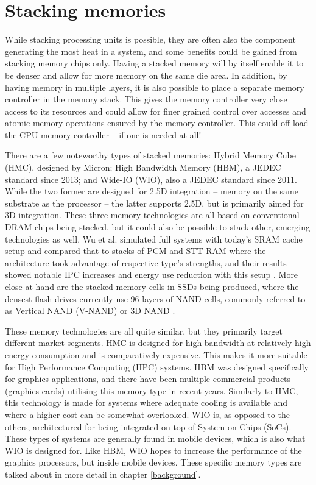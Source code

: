 \section{Stacking memories}
While stacking processing units is possible, they are often also the component generating the most heat in a system, and some benefits could be gained from stacking memory chips only. Having a stacked memory will by itself enable it to be denser and allow for more memory on the same die area. In addition, by having memory in multiple layers, it is also possible to place a separate memory controller in the memory stack. This gives the memory controller very close access to its resources and could allow for finer grained control over accesses and atomic memory operations ensured by the memory controller. This could off-load the CPU memory controller -- if one is needed at all!
\bigskip

There are a few noteworthy types of stacked memories: Hybrid Memory Cube (HMC), designed by Micron; High Bandwidth Memory (HBM), a JEDEC standard since 2013; and Wide-IO (WIO), also a JEDEC standard since 2011. While the two former are designed for 2.5D integration -- memory on the same substrate as the processor -- the latter supports 2.5D, but is primarily aimed for 3D integration. These three memory technologies are all based on conventional DRAM chips being stacked, but it could also be possible to stack other, emerging technologies as well. Wu et al. simulated full systems with today's SRAM cache setup and compared that to stacks of PCM and STT-RAM where the architecture took advantage of respective type's strengths, and their results showed notable IPC increases and energy use reduction with this setup \cite{Wu:2009:HCA:1555754.1555761}. More close at hand are the stacked memory cells in SSDs being produced, where the densest flash drives currently use 96 layers of NAND cells, commonly referred to as Vertical NAND (V-NAND) or 3D NAND \cite{tallis_2017}.
\bigskip

These memory technologies are all quite similar, but they primarily target different market segments. HMC is designed for high bandwidth at relatively high energy consumption and is comparatively expensive. This makes it more suitable for High Performance Computing (HPC) systems. HBM was designed specifically for graphics applications, and there have been multiple commercial products (graphics cards) utilising this memory type in recent years. Similarly to HMC, this technology is made for systems where adequate cooling is available and where a higher cost can be somewhat overlooked. WIO is, as opposed to the others, architectured for being integrated on top of System on Chips (SoCs). These types of systems are generally found in mobile devices, which is also what WIO is designed for. Like HBM, WIO hopes to increase the performance of the graphics processors, but inside mobile devices. These specific memory types are talked about in more detail in chapter \ref{background}.
\bigskip

